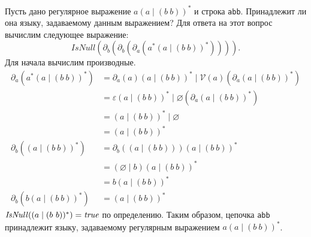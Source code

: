 \begin{example}
    Пусть дано регулярное выражение $a(a \mid (b \ b))^*$ и строка \texttt{abb}.
    Принадлежит ли она языку, задаваемому данным выражением?
    Для ответа на этот вопрос вычислим следующее выражение:
    \[
        \mathit{IsNull}(\partial_b(\partial_b(\partial_a(a^*(a \mid (b \ b))^*)))).
    \]
    Для начала вычислим производные.
    \begin{align*}
        \partial_a(a^*(a \mid (b \ b))^*) &= \partial_a(a) (a \mid (b \ b))^* \mid \mathcal{V}(a)(\partial_a(a \mid (b \ b))^*) \\
                                          &= \varepsilon (a \mid (b \ b))^* \mid \varnothing (\partial_a(a \mid (b \ b))^*) \\
                                          &= (a \mid (b \ b))^* \mid \varnothing \\
                                          &= (a \mid (b \ b))^*\\
        \partial_b((a \mid (b \ b))^*)    &= \partial_b((a \mid (b \ b))) (a \mid (b \ b))^* \\
                                          &= (\varnothing \mid b) (a \mid (b \ b))^* \\
                                          &= b (a \mid (b \ b))^* \\
        \partial_b(b (a \mid (b \ b))^*)  &= (a \mid (b \ b))^*
    \end{align*}
    $\mathit{IsNull}((a \mid (b \ b))^*) = \emph{true}$ по определению.
    Таким образом, цепочка \texttt{abb} принадлежит языку, задаваемому регулярным выражением $a(a \mid (b \ b))^*$.
\end{example}
